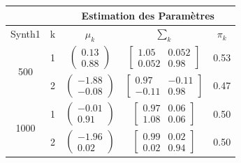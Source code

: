 \documentclass[10pt]{article}
\begin{document}
		\begin{center}		
		\begin{tabular}{ | c | c | c | c | c |}
			\rowcolor{lightgray}
			& &  \multicolumn{3}{c|}{Estimation des Paramètres} \\
			\hline  
			 Synth1 & k & $\mu_{k}$ & $\sum_{k}$ & $\pi_{k} $\\
			\hline   											
			\multirow{2}{*}{500}        &   1&       $\begin{pmatrix} 0.13\\0.88 \end{pmatrix}$            &         	$\begin{bmatrix} 1.05 & 0.052 \\ 0.052 & 0.98 \end{bmatrix}$             & 			0.53		\\\cline{2-5}
			        											&   2&         $\begin{pmatrix} -1.88\\-0.08 \end{pmatrix}$         &  
			        											$\begin{bmatrix} 0.97 & -0.11 \\ -0.11 & 0.98 \end{bmatrix}$                      & 		0.47		\\
		
			\hline
			\hline
			\multirow{2}{*}{1000}         &   1&   $\begin{pmatrix} -0.01\\0.91 \end{pmatrix}$           &        	$\begin{bmatrix} 0.97 & 0.06  \\ 1.08 & 0.06 \end{bmatrix}$          & 		0.50		\\\cline{2-5}
			         										&   2&       $\begin{pmatrix} -1.96\\0.02 \end{pmatrix}$            &    $\begin{bmatrix} 0.99 & 0.02 \\0.02 & 0.94 \end{bmatrix}$                  & 	0.50				\\
			\hline
			\end{tabular}
		\end{center}
	
\end{document}
